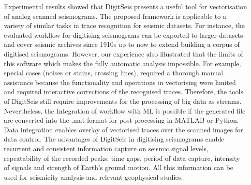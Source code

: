 \documentclass[sensors,article,accept,moreauthors,pdftex]{Definitions/mdpi}
\begin{document}
{Experimental results showed that DigitSeis presents a useful tool for }vectorisation of analog scanned seismograms. {The proposed framework is applicable to a variety of similar tasks in trace recognition for seismic datasets. For instance, the evaluated }workflow for digitising seismograms can be exported to larger datasets and cover seismic archives since 1910s up to now to {extend} building a corpus of digitised seismograms. {However, our }experience{ }also illustrated that {the limits of this software which makes the fully automatic analysis impossible}. For example,{ }special cases (noises or stains, crossing lines),{ required a thorough }manual assistance{ because the }functionality and operations in vectorising were limited and required interactive corrections of {the }recognised traces. {Therefore, the }tools of DigitSeis still require improvements for {the }processing of big data as streams. {Nevertheless, the }Integration of workflow with  {ML} is possible {if the} generated file {are converted into }the .mat format for post-processing in MATLAB {or Python. }Data integration {enables }overlay of vectorised traces over the scanned images for data control. The advantages of DigitSeis in digitising seismograms enable recurrent and consistent information capture on seismic signal levels, repeatability of the recorded peaks, time gaps, period of data capture, intensity of signals and strength of Earth's ground motion. All this information can be used for seismicity analysis and relevant geophysical studies. 

\vspace{6pt} 


\end{document}
